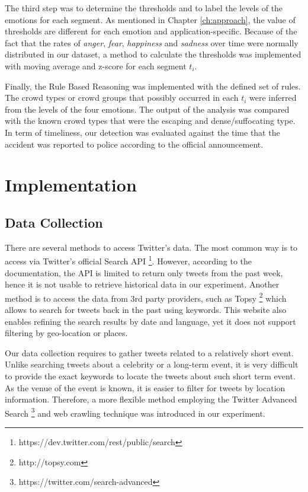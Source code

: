The third step was to determine the thresholds and to label the levels of the emotions for each segment. As mentioned in Chapter \ref{ch:approach}, the value of thresholds are different for each emotion and application-specific. Because of the fact that the rates of \textit{anger}, \textit{fear}, \textit{happiness} and \textit{sadness} over time were normally distributed in our dataset, a method to calculate the thresholds was implemented with moving average and z-score for each segment \(t_i\). 

Finally, the Rule Based Reasoning was implemented with the defined set of rules. The crowd types or crowd groups that possibly occurred in each \(t_i\) were inferred from the levels of the four emotions. The output of the analysis was compared with the known crowd types that were the escaping and dense/suffocating type. In term of timeliness, our detection was evaluated against the time that the accident was reported to police according to the official announcement.

\section{Implementation}

\subsection{Data Collection}
There are several methods to access Twitter's data. The most common way is to access via Twitter's official Search API \footnote{https://dev.twitter.com/rest/public/search}. However, according to the documentation, the API is limited to return only tweets from the past week, hence it is not usable to retrieve historical data in our experiment. Another method is to access the data from 3rd party providers, such as Topsy \footnote{http://topsy.com} which allows to search for tweets back in the past using keywords. This website also enables refining the search results by date and language, yet it does not support filtering by geo-location or places. 

Our data collection requires to gather tweets related to a relatively short event. Unlike searching tweets about a celebrity or a long-term event, it is very difficult to provide the exact keywords to locate the tweets about such short term event. As the venue of the event is known, it is easier to filter for tweets by location information. Therefore, a more flexible method employing the Twitter Advanced Search \footnote{https://twitter.com/search-advanced} and web crawling technique was introduced in our experiment.

